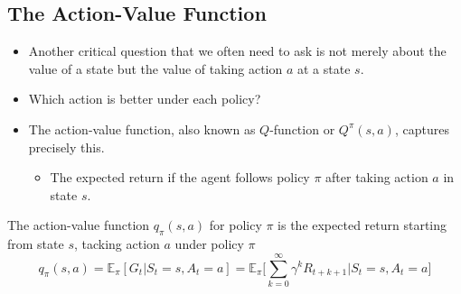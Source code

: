 \subsection{The Action-Value Function}
\begin{itemize}
	\item Another critical question that we often need to ask is not merely about the value of a state but the value of taking action $a$ at a state $s$.
	\item Which action is better under each policy?
	\item The action-value function, also known as $Q$-function or $Q^\pi(s,a)$, captures precisely this.
		\begin{itemize}
			\item The expected return if the agent follows policy $\pi$ after taking action $a$ in state $s$.
		\end{itemize}
\end{itemize}

\begin{definition}
	The action-value function $q_{\pi}(s,a)$ for policy $\pi$ is the expected return starting from state $s$, tacking action $a$ under policy $\pi$
	$$q_{\pi}(s,a) = \mathbb{E}_\pi[G_t|S_t=s, A_t=a]=\mathbb{E}_\pi\Bigg[\sum_{k=0}^{\infty}\gamma^k R_{t+k+1}\Bigg| S_t=s, A_t=a\Bigg]$$
\end{definition}

